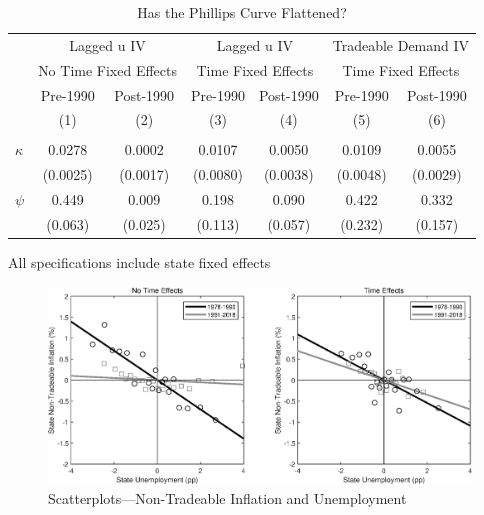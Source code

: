 \documentclass[english,xcolor=svgnames]{beamer}
\begin{document}
\begin{frame}
	\begin{table}[t]
		\centering 
		\small 
				\caption{Has the Phillips Curve Flattened?} \vspace{-5pt}
		\begin{tabular}{lcccccc} \hline 
			&\multicolumn{2}{c}{Lagged u IV} &\multicolumn{2}{c}{Lagged u IV} &\multicolumn{2}{c}{Tradeable Demand IV} \\
			&\multicolumn{2}{c}{No Time Fixed Effects} &\multicolumn{2}{c}{Time Fixed Effects} &\multicolumn{2}{c}{Time Fixed Effects} \\
			\cmidrule(r){2-3}\cmidrule(r){4-5}\cmidrule(r){6-7}
			& Pre-1990 & Post-1990 & Pre-1990 & Post-1990 & Pre-1990 & Post-1990 \\
			&(1) &(2) &(3) &(4) &(5) &(6) \\\midrule \\ [-2mm]
				
			$\kappa$     &      0.0278   &      0.0002   &   0.0107   &      0.0050  &      0.0109   &      0.0055   \\
			&    (0.0025)   &    (0.0017)   &    (0.0080)   &    (0.0038)   &    (0.0048)   &    (0.0029)  \\
			
			$\psi$      &       0.449   &       0.009   &     0.198   &       0.090   &     0.422   &       0.332   \\
			&     (0.063)   &     (0.025)   &    (0.113)   &     (0.057)  &    (0.232)   &     (0.157)  \\
						\bottomrule
		\end{tabular}
	\end{table}
	All specifications include state fixed effects
\end{frame}



\begin{frame}\label{scatterplots}
	\begin{figure}
		\centering 
		\includegraphics[width=1.0\textwidth]{figures/Fig_binscatter.eps}
		\caption{Scatterplots---Non-Tradeable Inflation and Unemployment}
	\end{figure}
	\hyperlink{Comparison}{}
\end{frame}
\end{document}
